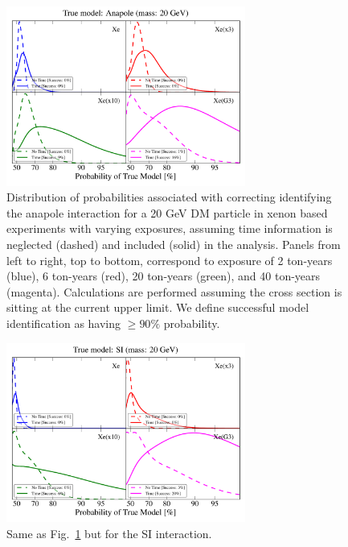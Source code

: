 \documentclass[11pt]{article}
\begin{document}
\begin{figure}
\centering
\includegraphics[width=0.7\textwidth]{plots/PDF_20GeV_Anapole_50sims_Xe_Xe3x_Xe10x_XeG3_GF_TNT.pdf}
\caption{\label{fig:20gev_anapole_XeFull_TNT_GF}
Distribution of probabilities associated with correcting identifying the anapole interaction for a 20 GeV DM particle in xenon based experiments with varying exposures, assuming time information is neglected (dashed) and included (solid) in the analysis. Panels from left to right, top to bottom, correspond to exposure of 2 ton-years (blue), 6 ton-years (red), 20 ton-years (green), and 40 ton-years (magenta). Calculations are performed assuming the cross section is sitting at the current upper limit. We define successful model identification as having $\geq 90 \%$ probability.}
\end{figure}

\begin{figure}
\centering
\includegraphics[width=0.7\textwidth]{plots/PDF_20GeV_SI_Higgs_50sims_Xe_Xe3x_Xe10x_XeG3_GF_TNT.pdf}
\caption{\label{fig:20gev_SI_Higgs_XeFull_TNT_GF}
Same as Fig.~\ref{fig:20gev_anapole_XeFull_TNT_GF} but for the SI interaction.}
\end{figure}
\end{document}

